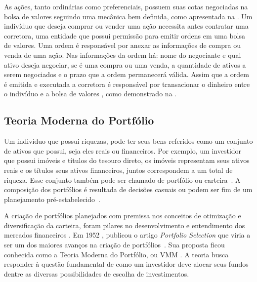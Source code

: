 As ações, tanto ordinárias como preferenciais, possuem suas cotas negociadas na bolsa de valores seguindo uma mecânica bem definida, como apresentada na . Um indivíduo que deseja comprar ou vender uma ação necessita antes contratar uma corretora, uma entidade que possui permissão para emitir ordens em uma bolsa de valores. Uma ordem é responsável por anexar as informações de compra ou venda de uma ação. Nas informações da ordem há: nome do negociante e qual ativo deseja negociar, se é uma compra ou uma venda, a quantidade de ativos a serem negociados e o prazo que a ordem permanecerá válida. Assim que a ordem é emitida e executada a corretora é responsável por transacionar o dinheiro entre o indivíduo e a bolsa de valores \cite{elton2012moderna}, como demonstrado na .


%

\subsection{Teoria Moderna do Portfólio}

Um indivíduo que possui riquezas, pode ter seus bens referidos como um conjunto de ativos que possui, seja eles reais ou financeiros. Por exemplo, um investidor que possui imóveis e títulos do tesouro direto, os imóveis representam seus ativos reais e os títulos seus ativos financeiros, juntos correspondem a um total de riqueza. Esse conjunto também pode ser chamado de portfólio ou carteira~\cite{elton2012moderna}. A composição dos portfólios é resultada de decisões casuais ou podem ser fim de um planejamento pré-estabelecido~\cite{elton2012moderna}.

A criação de portfólios planejados com premissa nos conceitos de otimização e diversificação da carteira, foram pilares no desenvolvimento e entendimento dos mercados financeiros \cite{kolm201460}. Em 1952 \textcite{markowitz}, publicou o artigo \emph{Portfolio Selection} que viria a ser um dos maiores avanços na criação de portfólios~\cite{kolm201460}. Sua proposta ficou conhecida como a Teoria Moderna do Portfólio, ou \acrfull{VMM} \cite{markowitz}. A teoria busca responder à questão fundamental de como um investidor deve alocar seus fundos dentre as diversas possibilidades de escolha de investimentos. 

